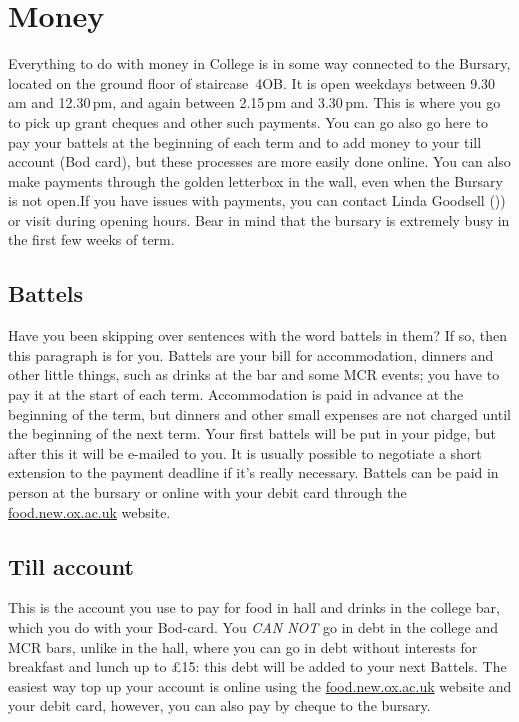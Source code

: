 
\chapter{Money}

Everything to do with money in College is in some way connected to the Bursary,
located on the ground floor of staircase~4OB. It is open weekdays between
9.30\,am and 12.30\,pm, and again between 2.15\,pm and 3.30\,pm. This is where you go to pick up grant cheques and other such payments. You can go also go here to pay your battels at the beginning of each term and to add money to your till account (Bod card), but these processes are more easily done online. You can also make payments through the golden letterbox in the wall, even when the Bursary is not open.If you have issues with payments, you can contact Linda Goodsell (\href{mailto:linda.goodsell@new.ox.ac.uk}{})) or visit during opening hours. Bear in mind that the bursary is extremely busy in the first few weeks of term.

\section{Battels}
Have you been skipping over sentences with the word battels in them? If so, then
this paragraph is for you. Battels are your bill for accommodation, dinners and
other little things, such as drinks at the bar and some MCR events; you have to pay it at the start of each term. Accommodation is paid in advance at the beginning of the term, but dinners and other small expenses are not charged until the beginning of the next term. Your first battels will be put in your pidge, but after this it will be e-mailed to you. It is usually possible to negotiate a short extension to the payment deadline if it's really necessary. Battels can be paid in person at the bursary or online with your debit card through the \url{food.new.ox.ac.uk} website.
\section{Till account}
This is the account you use to pay for food in hall and drinks in the college
bar, which you do with your Bod-card. You \emph{CAN NOT} go in debt in the
college and MCR bars, unlike in the hall, where you can go in debt without
interests for breakfast and lunch up to \pounds15: this debt will be added to your next Battels. The easiest way top up
your account is online using the \url{food.new.ox.ac.uk} website and your debit card, however, you can also pay by cheque to the bursary.

